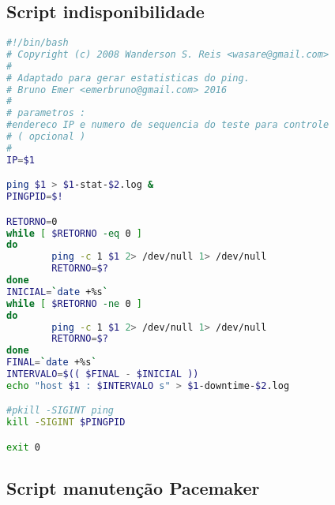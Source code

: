 
\chapter{}
\label{cap:apscripts}

\section{Script indisponibilidade}
\label{ap:scriptindisp}

\begin{lstlisting}[language=bash]
#!/bin/bash
# Copyright (c) 2008 Wanderson S. Reis <wasare@gmail.com>
#
# Adaptado para gerar estatisticas do ping.
# Bruno Emer <emerbruno@gmail.com> 2016
#
# parametros :
#endereco IP e numero de sequencia do teste para controle
# ( opcional )
#
IP=$1

ping $1 > $1-stat-$2.log &
PINGPID=$!

RETORNO=0
while [ $RETORNO -eq 0 ]
do
        ping -c 1 $1 2> /dev/null 1> /dev/null
        RETORNO=$?
done
INICIAL=`date +%s`
while [ $RETORNO -ne 0 ]
do
        ping -c 1 $1 2> /dev/null 1> /dev/null
        RETORNO=$?
done
FINAL=`date +%s`
INTERVALO=$(( $FINAL - $INICIAL ))
echo "host $1 : $INTERVALO s" > $1-downtime-$2.log

#pkill -SIGINT ping
kill -SIGINT $PINGPID

exit 0
\end{lstlisting}


\section{Script manutenção Pacemaker}
\label{ap:scriptmanutencao}

